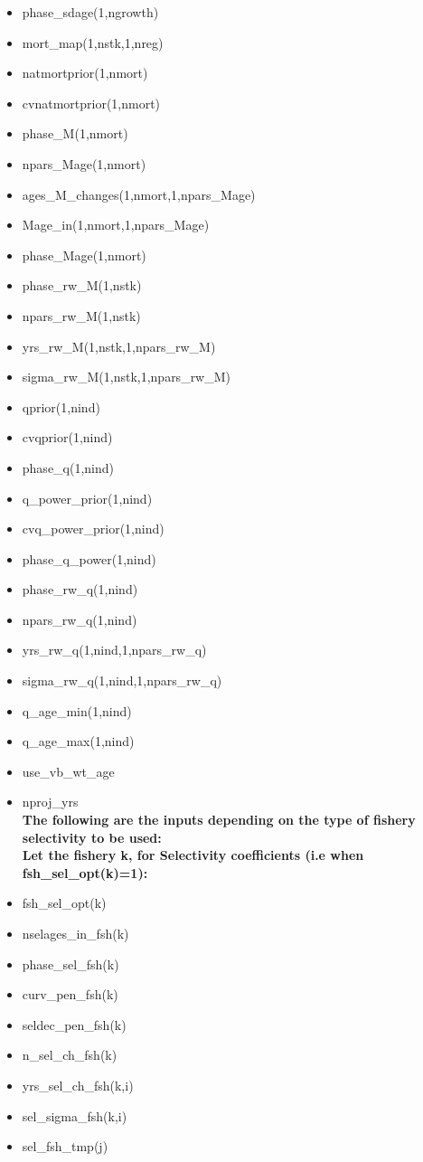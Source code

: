 \documentclass{article}
\begin{document}
\begin{itemize}
    \item phase\_sdage(1,ngrowth)
    \item mort\_map(1,nstk,1,nreg)
    \item natmortprior(1,nmort)
    \item cvnatmortprior(1,nmort)
    \item phase\_M(1,nmort)
    \item npars\_Mage(1,nmort)
    \item ages\_M\_changes(1,nmort,1,npars\_Mage)
    \item Mage\_in(1,nmort,1,npars\_Mage)
    \item phase\_Mage(1,nmort)
    \item phase\_rw\_M(1,nstk)
    \item npars\_rw\_M(1,nstk)
    \item yrs\_rw\_M(1,nstk,1,npars\_rw\_M)
    \item sigma\_rw\_M(1,nstk,1,npars\_rw\_M)
    \item qprior(1,nind)
    \item cvqprior(1,nind)  
    \item phase\_q(1,nind)
    \item q\_power\_prior(1,nind)
    \item cvq\_power\_prior(1,nind) 
    \item phase\_q\_power(1,nind)
    \item phase\_rw\_q(1,nind)
    \item npars\_rw\_q(1,nind)
    \item yrs\_rw\_q(1,nind,1,npars\_rw\_q)
    \item sigma\_rw\_q(1,nind,1,npars\_rw\_q)
    \item q\_age\_min(1,nind)
    \item q\_age\_max(1,nind) 
    \item use\_vb\_wt\_age 
    \item nproj\_yrs\\
    
    \textbf{The following are the inputs depending on the type of fishery selectivity to be used:}\\
    
    \textbf{Let the fishery k, for Selectivity coefficients (i.e when fsh\_sel\_opt(k)=1):}\\
    
    \item fsh\_sel\_opt(k)
    \item nselages\_in\_fsh(k)
    \item phase\_sel\_fsh(k)
    \item curv\_pen\_fsh(k)
    \item seldec\_pen\_fsh(k) 
    \item n\_sel\_ch\_fsh(k)
    \item yrs\_sel\_ch\_fsh(k,i)
    \item sel\_sigma\_fsh(k,i)
    \item sel\_fsh\_tmp(j)\\
    

\end{itemize}
\end{document}
